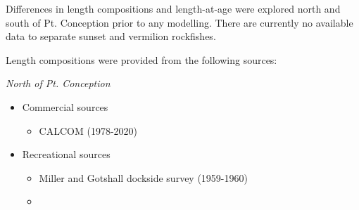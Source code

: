 \documentclass[11pt,
  english,
  a4paper,
]{article}
\begin{document}
\leavevmode\tagmcend\tagstructend

Differences in length compositions and length-at-age were explored north and south of Pt. Conception prior to any modelling. There are currently no available data to separate sunset and vermilion rockfishes.

Length compositions were provided from the following sources:

\emph{North of Pt. Conception}


\begin{itemize}
\item

  Commercial sources

  \tagmcend\tagstructend\tagstructend


  \begin{itemize}
  \item


    CALCOM (1978-2020)

    \tagmcend\tagstructend\tagstructend

    \tagmcend\tagstructend\tagstructend
  \end{itemize}

  \tagstructend
\item

  Recreational sources

  \tagmcend\tagstructend\tagstructend


  \begin{itemize}
  \item


    Miller and Gotshall dockside survey (1959-1960)

    \tagmcend\tagstructend\tagstructend

    \tagmcend\tagstructend\tagstructend
  \item


\end{itemize}
\end{itemize}
\end{document}
